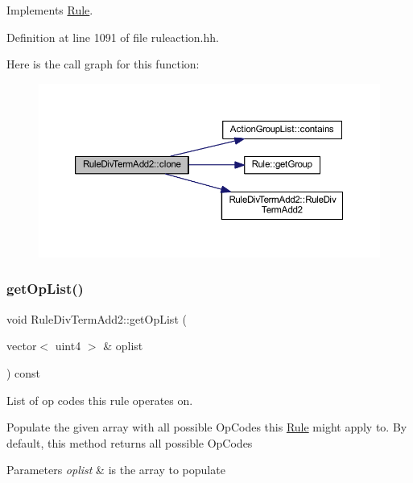 Implements \mbox{\hyperlink{class_rule_a70de90a76461bfa7ea0b575ce3c11e4d}{Rule}}.



Definition at line 1091 of file ruleaction.\+hh.

Here is the call graph for this function\+:
\nopagebreak
\begin{figure}[H]
\begin{center}
\leavevmode
\includegraphics[width=350pt]{class_rule_div_term_add2_a96c85869d2834b58cbc49a940eecd53d_cgraph}
\end{center}
\end{figure}
\mbox{\label{class_rule_div_term_add2_a54b666a499dfbc3547349e3c1dafe3da}} 
\subsubsection{\texorpdfstring{getOpList()}{getOpList()}}
{\footnotesize\ttfamily void Rule\+Div\+Term\+Add2\+::get\+Op\+List (\begin{DoxyParamCaption}\item[{vector$<$ uint4 $>$ \&}]{oplist }\end{DoxyParamCaption}) const\hspace{0.3cm}{\ttfamily [virtual]}}



List of op codes this rule operates on. 

Populate the given array with all possible Op\+Codes this \mbox{\hyperlink{class_rule}{Rule}} might apply to. By default, this method returns all possible Op\+Codes 
\begin{DoxyParams}{Parameters}
{\em oplist} & is the array to populate \\
\hline
\end{DoxyParams}


